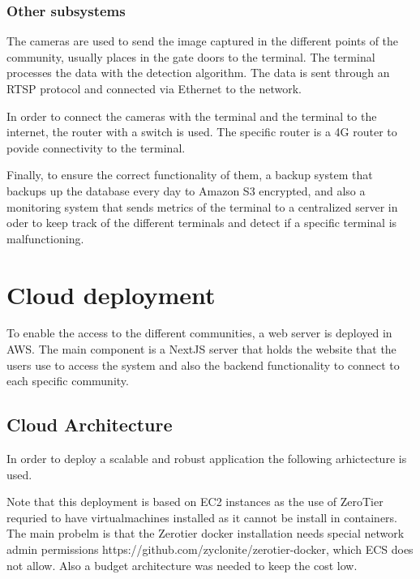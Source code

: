 
\subsubsection{Other subsystems}

The cameras are used to send the image captured in the different points of the community, usually places in the gate doors to the terminal. The terminal processes the data with the detection algorithm. The data is sent through an RTSP  protocol and connected via Ethernet to the network.

In order to connect the cameras with the terminal and the terminal to the internet, the router with a switch is used. The specific router is a 4G router to povide connectivity to the terminal.

Finally, to ensure the correct functionality of them, a backup system that backups up the database every day to Amazon S3  encrypted, and also a monitoring system that sends metrics of the terminal to a centralized server in oder to keep track of the different terminals and detect if a specific terminal is malfunctioning.

\section{Cloud deployment}

To enable the access to the different communities, a web server is deployed in AWS. The main component is a NextJS server that holds the website that the users use to access the system and also the backend functionality to connect to each specific community.

\subsection{Cloud Architecture}

In order to deploy a scalable and robust application the following arhictecture is used.


Note that this deployment is based on EC2 instances as the use of ZeroTier requried to have virtualmachines installed as it cannot be install in containers. The main probelm is that the Zerotier docker installation needs special network admin permissions https://github.com/zyclonite/zerotier-docker, which ECS  does not allow. Also a budget architecture was needed to keep the cost low.

